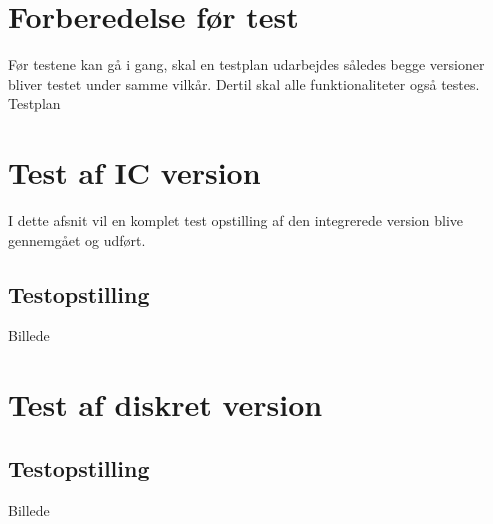 \section{Forberedelse før test}\label{afs:tests}

Før testene kan gå i gang, skal en testplan udarbejdes således begge versioner bliver testet under samme vilkår. Dertil skal alle funktionaliteter også testes.
\\

Testplan 


\section{Test af IC version}\label{afs:test_ic}
I dette afsnit vil en komplet test opstilling af den integrerede version blive gennemgået og udført.

\subsection{Testopstilling}
Billede

\section{Test af diskret version}\label{afs:test_diskret}


\subsection{Testopstilling}
Billede

